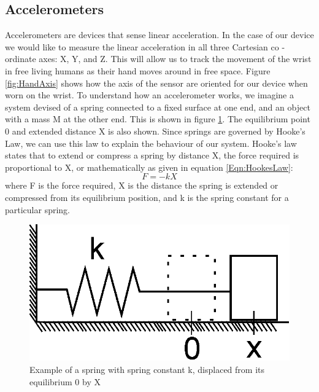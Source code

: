 \subsection{Accelerometers}
\label{Sec:Accelerometer}
Accelerometers are devices that sense linear acceleration.
In the case of our device we would like to measure the linear acceleration in all three Cartesian co - ordinate axes: X, Y, and Z.
This will allow us to track the movement of the wrist in free living humans as their hand moves around in free space.
Figure \ref{fig:HandAxis} shows how the axis of the sensor are oriented for our device when worn on the wrist.
To understand how an accelerometer works,
we imagine a system devised of a spring connected to a fixed surface at one end,
and an object with a mass M at the other end. This is shown in figure \ref{fig:HookeSpring}.
The equilibrium point 0 and extended distance X is also shown.
Since springs are governed by Hooke's Law, we can use this law to explain the behaviour of our system.
Hooke's law states that to extend or compress a spring by distance X,
the force required is proportional to X, or mathematically as given in equation \ref{Eqn:HookesLaw}:
\begin{equation}
\label{Eqn:HookesLaw}
F = -kX 
\end{equation}
where F is the force required, X is the distance the spring is extended or compressed from its equilibrium position, and k is the spring constant for a particular spring.
\begin{figure}
\begin{center}
\includegraphics{images/HookesLaw.eps}
\caption{Example of a spring with spring constant k, displaced from its equilibrium 0 by X}
\label{fig:HookeSpring}
\end{center}
\end{figure}

